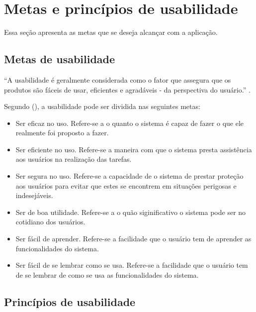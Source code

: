 \chapter{Metas e princípios de usabilidade}
  
  Essa seção apresenta as metas que se deseja alcançar com a aplicação.

  \section{Metas de usabilidade}
  
    “A usabilidade é geralmente considerada como o fator que assegura que os produtos são fáceis de usar, 
    eficientes e agradáveis - da perspectiva do usuário.” \cite{preece}.
    
    Segundo \citeauthor{preece} (\citeyear{preece}), a usabilidade pode ser dividida nas seguintes metas:
    
    \begin{itemize}
       \item Ser eficaz no uso.
       \subitem Refere-se a o quanto o sistema é capaz de fazer o que ele realmente foi proposto a fazer.
 
       \item Ser eficiente no uso.
       \subitem Refere-se a maneira com que o sistema presta assistência aos usuários na realização das tarefas.

       \item Ser segura no uso.
       \subitem Refere-se a capacidade de o sistema de prestar proteção aos usuários para evitar que estes se encontrem 
       em situações perigosas e indesejáveis.

       \item Ser de boa utilidade.
       \subitem Refere-se a o quão siginificativo o sistema pode ser no cotidiano dos usuários.

       \item Ser fácil de aprender.
       \subitem Refere-se a facilidade que o usuário tem de aprender as funcionalidades do sistema.

       \item Ser fácil de se lembrar como se usa.
       \subitem Refere-se a facilidade que o usuário tem de se lembrar de como se usa as funcionalidades do sistema.
    \end{itemize}
    
  \section{Princípios de usabilidade}
  
